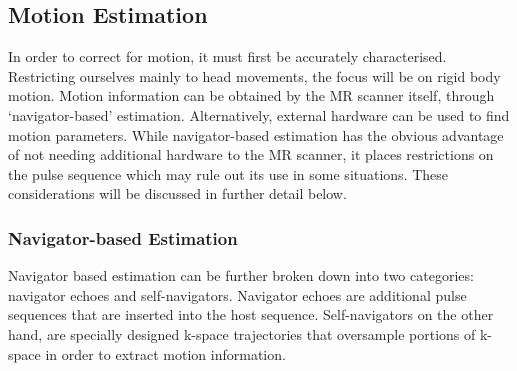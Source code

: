 \documentclass[class=article, crop=false]{standalone}
\begin{document}
	
\subsection{Motion Estimation}
In order to correct for motion, it must first be accurately characterised. Restricting ourselves mainly to head movements, the focus will be on rigid body motion. Motion information can be obtained by the MR scanner itself, through `navigator-based' estimation. Alternatively, external hardware can be used to find motion parameters. While navigator-based estimation has the obvious advantage of not needing additional hardware to the MR scanner, it places restrictions on the pulse sequence which may rule out its use in some situations. These considerations will be discussed in further detail below.

\subsubsection{Navigator-based Estimation}
Navigator based estimation can be further broken down into two categories: navigator echoes and self-navigators. Navigator echoes are additional pulse sequences that are inserted into the host sequence. Self-navigators on the other hand, are specially designed k-space trajectories that oversample portions of k-space in order to extract motion information.
\end{document}

